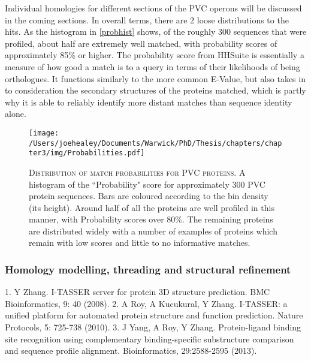 Individual homologies for different sections of the PVC operons will be discussed in the coming sections. In overall terms, there are 2 loose distributions to the hits. As the histogram in \vref{probhist} shows, of the roughly 300 sequences that were profiled, about half are extremely well matched, with probability scores of approximately 85\% or higher. The probability score from HHSuite is essentially a measure of how good a match is to a query in terms of their likelihoods of being orthologues. It functions similarly to the more common E-Value, but also takes in to consideration the secondary structures of the proteins matched, which is partly why it is able to reliably identify more distant matches than sequence identity alone.

\begin{figure}[h]
\texttt{[image: /Users/joehealey/Documents/Warwick/PhD/Thesis/chapters/chapter3/img/Probabilities.pdf]}
	\captionsetup{singlelinecheck=off, justification=justified, font=footnotesize, aboveskip=10pt}
	\caption[HHPred orthologue match scores]{\textsc{\normalsize Distribution of match probabilities for PVC proteins.}\vspace{0.1cm} \newline A histogram of the ``Probability" score for approximately 300 PVC protein sequences. Bars are coloured according to the bin density (its height). Around half of all the proteins are well profiled in this manner, with Probability scores over 80\%. The remaining proteins are distributed widely with a number of examples of proteins which remain with low scores and little to no informative matches.}
	\label{probhist}
\end{figure}


\subsubsection{Homology modelling, threading and structural refinement}

   1. Y Zhang. I-TASSER server for protein 3D structure prediction.
      BMC Bioinformatics, 9: 40 (2008).
   2. A Roy, A Kucukural, Y Zhang. I-TASSER: a unified platform
      for automated protein structure and function prediction.
      Nature Protocols, 5: 725-738 (2010).
   3. J Yang, A Roy, Y Zhang. Protein-ligand binding site recognition
      using complementary binding-specific substructure comparison and
      sequence profile alignment. Bioinformatics, 29:2588-2595 (2013).

